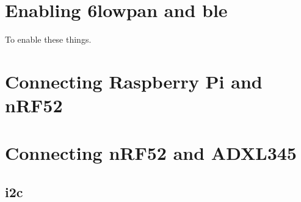 \section{Enabling \gls{6lowpan} and \gls{ble}}

To enable these things. 

\section{Connecting Raspberry Pi and nRF52}

\section{Connecting nRF52 and ADXL345}

\subsection{\gls{}}

\subsection{\gls{i2c}}



